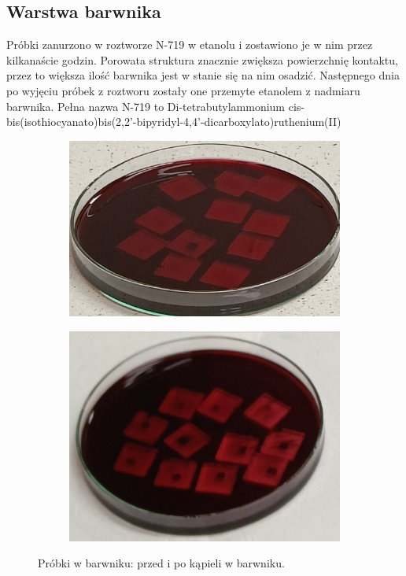 \documentclass[12pt]{article}
\begin{document}
	\subsection{Warstwa barwnika}
	Próbki zanurzono w roztworze N-719 w etanolu i zostawiono je w nim przez kilkanaście godzin. Porowata struktura  znacznie zwiększa powierzchnię kontaktu, przez to większa ilość barwnika jest w stanie się na nim osadzić. Następnego dnia po wyjęciu próbek z roztworu zostały one przemyte etanolem z nadmiaru barwnika. Pełna nazwa N-719 to Di-tetrabutylammonium cis-bis(isothiocyanato)bis(2,2'-bipyridyl-4,4'-dicarboxylato)ruthenium(II)
	\begin{figure}[H]
		\centering
		\begin{subfigure}{0.45\textwidth}
			\centering
			\includegraphics[width=\textwidth]{probki_w_barwniku_przed.png}
			\caption{\label{fig:barwnik_przed}}
		\end{subfigure}
		\begin{subfigure}{0.45\textwidth}
			\includegraphics[width=\textwidth]{probki_w_barwniku_po.png}
			\caption{\label{fig:barwnik_po}}
		\end{subfigure}
		\captionsetup{subrefformat=parens}
		\caption{Próbki w barwniku:  przed i  po kąpieli w barwniku.}
	\end{figure}
	
\end{document}
